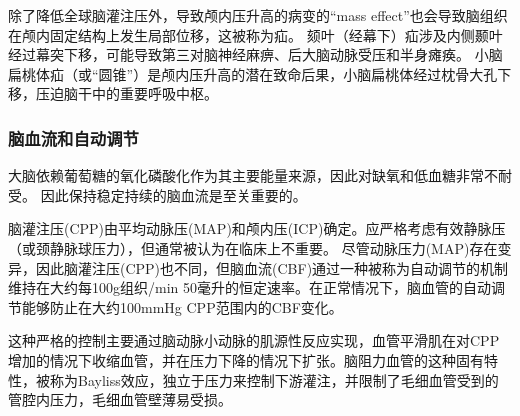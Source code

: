 \documentclass[titlepage,12pt]{article}
\begin{document}
除了降低全球脑灌注压外，导致颅内压升高的病变的“mass effect”也会导致脑组织在颅内固定结构上发生局部位移，这被称为疝。
颏叶（经幕下）疝涉及内侧颞叶经过幕突下移，可能导致第三对脑神经麻痹、后大脑动脉受压和半身瘫痪。
小脑扁桃体疝（或“圆锥”）是颅内压升高的潜在致命后果，小脑扁桃体经过枕骨大孔下移，压迫脑干中的重要呼吸中枢。
\subsubsection{脑血流和自动调节}
大脑依赖葡萄糖的氧化磷酸化作为其主要能量来源，因此对缺氧和低血糖非常不耐受。
因此保持稳定持续的脑血流是至关重要的。

脑灌注压(CPP)由平均动脉压(MAP)和颅内压(ICP)确定。应严格考虑有效静脉压（或颈静脉球压力），但通常被认为在临床上不重要。
尽管动脉压力(MAP)存在变异，因此脑灌注压(CPP)也不同，但脑血流(CBF)通过一种被称为自动调节的机制维持在大约每100g组织/min 50毫升的恒定速率。在正常情况下，脑血管的自动调节能够防止在大约100mmHg CPP范围内的CBF变化。

这种严格的控制主要通过脑动脉小动脉的肌源性反应实现，血管平滑肌在对CPP增加的情况下收缩血管，并在压力下降的情况下扩张。脑阻力血管的这种固有特性，被称为Bayliss效应，独立于压力来控制下游灌注，并限制了毛细血管受到的管腔内压力，毛细血管壁薄易受损。
\end{document}
